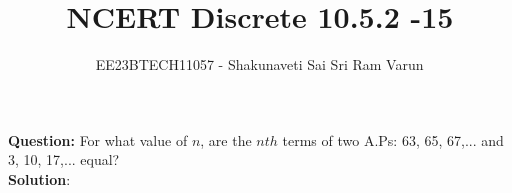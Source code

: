 \documentclass[journal,12pt,twocolumn]{IEEEtran}
\theoremstyle{remark}
\begin{document}

\vspace{3cm}

\title{NCERT Discrete 10.5.2 -15}
\author{EE23BTECH11057 - Shakunaveti Sai Sri Ram Varun$^{}$%
}
\maketitle
\newpage
\bigskip

\renewcommand{\thefigure}{\theenumi}
\renewcommand{\thetable}{\theenumi}
\vspace{2cm}
\textbf{Question: }
For what value of $ n$, are the $ nth$ terms of two A.Ps: 63, 65, 67,... and 3, 10, 17,... equal?\\
\vspace{0.5cm}
\textbf{Solution}:
\end{document}
